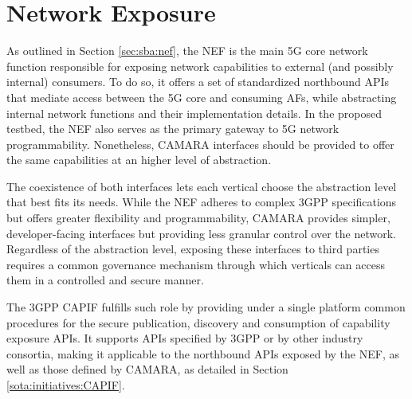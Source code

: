 \section{Network Exposure}
\label{chap:proposal:exposure}

As outlined in Section \ref{sec:sba:nef}, the \acf{NEF} is the main \acs{5G} core network function responsible for exposing network capabilities to external (and possibly internal) consumers. To do so, it offers a set of standardized northbound \acsp{API} that mediate access between the \acs{5G} core and consuming \acsp{AF}, while abstracting internal network functions and their implementation details. In the proposed testbed, the \acs{NEF} also serves as the primary gateway to \acs{5G} network programmability. Nonetheless, CAMARA interfaces should be provided to offer the same capabilities at an higher level of abstraction.

The coexistence of both interfaces lets each vertical choose the abstraction level that best fits its needs. While the \acs{NEF} adheres to complex \acs{3GPP} specifications but offers greater flexibility and programmability, CAMARA provides simpler, developer-facing interfaces but providing less granular control over the network. Regardless of the abstraction level, exposing these interfaces to third parties requires a common governance mechanism through which verticals can access them in a controlled and secure manner. 

The \acs{3GPP} \acs{CAPIF} fulfills such role by providing under a single platform common procedures for the secure publication, discovery and consumption of capability exposure \acsp{API}. It supports \acsp{API} specified by \acs{3GPP} or by other industry consortia, making it applicable to the northbound \acsp{API} exposed by the \acs{NEF}, as well as those defined by CAMARA, as detailed in Section \ref{sota:initiatives:CAPIF}.





